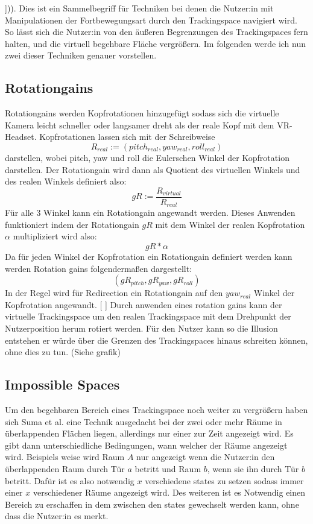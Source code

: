 ])). Dies ist ein Sammelbegriff für Techniken bei denen die Nutzer:in mit Manipulationen der Fortbewegungsart durch den Trackingspace navigiert wird.
So lässt sich die Nutzer:in von den äußeren Begrenzungen des Trackingspaces fern halten, und die virtuell begehbare Fläche vergrößern.
Im folgenden werde ich nun zwei dieser Techniken genauer vorstellen.

\subsection{Rotationgains}
Rotationgains werden Kopfrotationen hinzugefügt sodass sich die virtuelle Kamera leicht schneller oder langsamer dreht als der reale
Kopf mit dem VR-Headset. Kopfrotationen lassen sich mit der Schreibweise
$$ R_{real} := (pitch_{real}, yaw_{real}, roll_{real}) $$
darstellen, wobei pitch, yaw und roll
die Eulerschen Winkel der Kopfrotation darstellen. Der Rotationgain wird dann als Quotient des virtuellen Winkels und des realen Winkels definiert also:
$$ gR := \frac{R_{virtual}}{R_{real}} $$
Für alle 3 Winkel kann ein Rotationgain angewandt werden.
Dieses Anwenden funktioniert indem der Rotationgain $gR$ mit dem Winkel der realen Kopfrotation $\alpha$ multipliziert wird also:
$$ gR * \alpha $$
Da für jeden Winkel der Kopfrotation ein Rotationgain definiert werden kann werden Rotation gains folgendermaßen dargestellt:
$$(gR_{pitch}, gR_{yaw}, gR_{roll})$$
In der Regel wird für Redirection ein Rotationgain auf den $yaw_{real}$ Winkel der Kopfrotation angewandt.
[
]
Durch anwenden eines rotation gains kann der virtuelle Trackingspace um den realen Trackingspace mit dem Drehpunkt der Nutzerposition herum rotiert werden.
Für den Nutzer kann so die Illusion entstehen er würde über die Grenzen des Trackingspaces hinaus schreiten können, ohne dies zu tun. (Siehe grafik)

\subsection{Impossible Spaces}
Um den begehbaren Bereich eines Trackingspace noch weiter zu vergrößern haben sich Suma et al. \cite{impossible-spaces-suma} eine Technik ausgedacht bei der zwei oder mehr Räume in überlappenden Flächen liegen, allerdings nur einer zur Zeit angezeigt wird. Es gibt dann unterschiedliche Bedingungen, wann welcher der Räume angezeigt wird. Beispiels weise wird Raum $A$ nur angezeigt wenn die Nutzer:in den überlappenden Raum durch Tür $a$ betritt und Raum $b$, wenn sie ihn durch Tür $b$ betritt.
Dafür ist es also notwendig $x$ verschiedene states
zu setzen sodass immer einer $x$ verschiedener Räume angezeigt wird. Des weiteren ist es Notwendig einen Bereich zu erschaffen in dem zwischen den states gewechselt werden kann, ohne dass die Nutzer:in es merkt.


